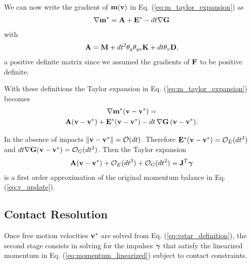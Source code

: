 \begin{IEEEproof}
We can now write the gradient of ${\mathbf{m}}({\mathbf{v}})$ in Eq. (\ref{eq:m_taylor_expansion}) as
\begin{eqnarray}
	\nabla{\mathbf{m}}^* = {\mathbf{A}} + {\mathbf{E}}^* - dt\nabla{\mathbf{G}}
\end{eqnarray}
with 
\begin{eqnarray}
	{\mathbf{A}}={\mathbf{M}}+ dt^2\theta_q\theta_{qv}{\mathbf{K}}+dt\theta_v{\mathbf{D}},
\end{eqnarray}
a positive definite matrix since we assumed the gradients of ${\mathbf{F}}$ to be
positive definite.

With these definitions the Taylor expansion in Eq. (\ref{eq:m_taylor_expansion})
becomes
\begin{multline}
	\nabla{\mathbf{m}}^*({\mathbf{v}}-{\mathbf{v}}^*) =\\
	{\mathbf{A}}({\mathbf{v}}-{\mathbf{v}}^*) + {\mathbf{E}}^*({\mathbf{v}}-{\mathbf{v}}^*) - dt\,\nabla{\mathbf{G}}\,({\mathbf{v}}-{\mathbf{v}}^*).
\end{multline}

In the absence of impacts $\Vert{\mathbf{v}}-{\mathbf{v}}^*\Vert=\mathcal{O}(dt)$. Therefore
${\mathbf{E}}^*({\mathbf{v}}-{\mathbf{v}}^*)=\mathcal{O}_E(dt^3)$ and
$dt\nabla{\mathbf{G}}({\mathbf{v}}-{\mathbf{v}}^*)=\mathcal{O}_G(dt^2)$. Then the Taylor expansion
\begin{eqnarray}
	{\mathbf{A}}({\mathbf{v}}-{\mathbf{v}}^*) + \mathcal{O}_E(dt^3) + \mathcal{O}_G(dt^2) = {\mathbf{J}}^T{\mathbf{{\bm\gamma}}}
\end{eqnarray}
is a first order approximation of the original momentum balance in Eq. (\ref{eq:v_update}).

\end{IEEEproof}

\subsection{Contact Resolution}
\label{sec:contact_constrained_velocities}

Once free motion velocities ${\mathbf{v}}^*$ are solved from Eq.
(\ref{eq:vstar_definition}), the second stage consists in solving for the
impulses ${\bm\gamma}$ that satisfy the linearized momentum in Eq.
(\ref{eq:momentum_linearized}) subject to contact constraints.

